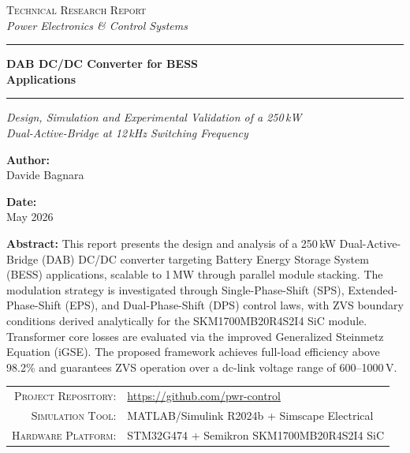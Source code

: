 \documentclass[12pt, a4paper]{article}
\newcommand{\DocCategory}{Technical Research Report}
\newcommand{\DocField}{Power Electronics \& Control Systems}
\newcommand{\DocTitle}{%
    DAB DC/DC Converter for BESS\\
    Applications
}
\newcommand{\DocSubtitle}{%
    Design, Simulation and Experimental Validation of a 250\,kW\\
    Dual-Active-Bridge at 12\,kHz Switching Frequency
}
\newcommand{\DocAuthor}{Davide Bagnara}
\newcommand{\DocDate}{May 2026}
\newcommand{\DocAbstract}{%
    This report presents the design and analysis of a 250\,kW
    Dual-Active-Bridge (DAB) DC/DC converter targeting Battery Energy
    Storage System (BESS) applications, scalable to 1\,MW through parallel
    module stacking. The modulation strategy is investigated through
    Single-Phase-Shift (SPS), Extended-Phase-Shift (EPS), and
    Dual-Phase-Shift (DPS) control laws, with ZVS boundary conditions
    derived analytically for the SKM1700MB20R4S2I4 SiC module.
    Transformer core losses are evaluated via the improved Generalized
    Steinmetz Equation (iGSE). The proposed framework achieves full-load
    efficiency above 98.2\% and guarantees ZVS operation over a dc-link
    voltage range of 600--1000\,V.
}
\newcommand{\MetaLabelA}{Project Repository}
\newcommand{\MetaValueA}{https://github.com/pwr-control}
\newcommand{\MetaLabelB}{Simulation Tool}
\newcommand{\MetaValueB}{MATLAB/Simulink R2024b + Simscape Electrical}
\newcommand{\MetaLabelC}{Hardware Platform}
\newcommand{\MetaValueC}{STM32G474 + Semikron SKM1700MB20R4S2I4 SiC}
\begin{document}
\begin{center}
    {\large\scshape \DocCategory}\\[4pt]
    {\small\itshape \DocField}
\end{center}

\vspace{10pt}
\noindent\rule{\linewidth}{0.8pt}

\vspace{28pt}
\begin{center}
    {\fontsize{22}{30}\selectfont\bfseries \DocTitle}
\end{center}

\vspace{4pt}
\noindent\rule{\linewidth}{0.8pt}

\vspace{14pt}
\begin{center}
    {\large\itshape \DocSubtitle}
\end{center}

\vspace{36pt}

\noindent
\begin{minipage}[t]{0.48\linewidth}
    \textbf{Author:}\\[2pt]
    \DocAuthor
\end{minipage}%
\hfill
\begin{minipage}[t]{0.48\linewidth}
    \raggedleft
    \textbf{Date:}\\[2pt]
    \DocDate
\end{minipage}

\vspace{36pt}

\begin{center}
\begin{minipage}{0.88\linewidth}
    \small
    \textbf{Abstract:} \DocAbstract
\end{minipage}
\end{center}

\vfill

\noindent
\begin{tabular}{@{} r @{\quad} l @{}}
    \textsc{\small\MetaLabelA:} & {\small\url{\MetaValueA}} \\[3pt]
    \textsc{\small\MetaLabelB:} & {\small\MetaValueB}       \\[3pt]
    \textsc{\small\MetaLabelC:} & {\small\MetaValueC}       \\
\end{tabular}

\newpage
{}
\setcounter{page}{1}

\end{document}
